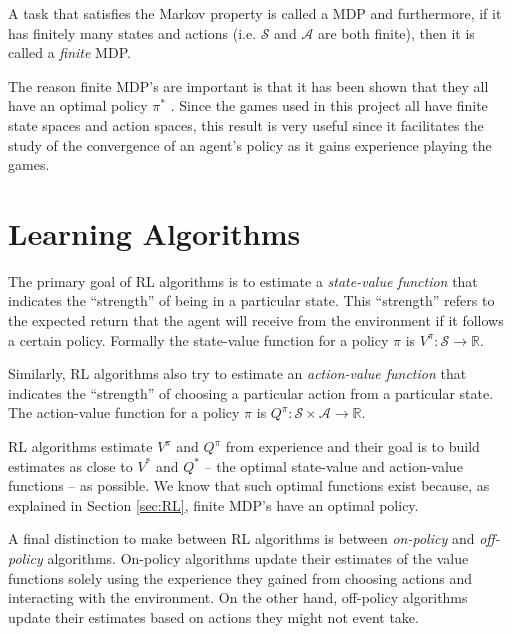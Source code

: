 \documentclass[11pt,a4paper]{report}
\begin{document}
A task that satisfies the Markov property is called a MDP and furthermore, if it has finitely many states and actions (i.e. $\mathcal{S}$ and $\mathcal{A}$ are both finite), then it is called a \emph{finite} MDP. 

The reason finite MDP's are important is that it has been shown that they all have an optimal policy $\pi^{\ast}$ \cite{rl-book}. Since the games used in this project all have finite state spaces and action spaces, this result is very useful since it facilitates the study of the convergence of an agent's policy as it gains experience playing the games.


\section{Learning Algorithms}

The primary goal of RL algorithms is to estimate a \emph{state-value function} that indicates the ``strength'' of being in a particular state. This ``strength'' refers to the expected return that the agent will receive from the environment if it follows a certain policy. Formally the state-value function for a policy $\pi$ is $V^{\pi} : \mathcal{S} \rightarrow \mathbb{R}$.

Similarly, RL algorithms also try to estimate an \emph{action-value function} that indicates the ``strength'' of choosing a particular action from a particular state. The action-value function for a policy $\pi$ is $Q^{\pi} : \mathcal{S} \times \mathcal{A} \rightarrow \mathbb{R}$.

RL algorithms estimate $V^{\pi}$ and $Q^{\pi}$ from experience and their goal is to build estimates as close to $V^{\ast}$ and $Q^{\ast}$ -- the optimal state-value and action-value functions -- as possible. We know that such optimal functions exist because, as explained in Section \ref{sec:RL}, finite MDP's have an optimal policy.

A final distinction to make between RL algorithms is between \emph{on-policy} and \emph{off-policy} algorithms. On-policy algorithms update their estimates of the value functions solely using the experience they gained from choosing actions and interacting with the environment. On the other hand, off-policy algorithms update their estimates based on actions they might not event take.
\end{document}
